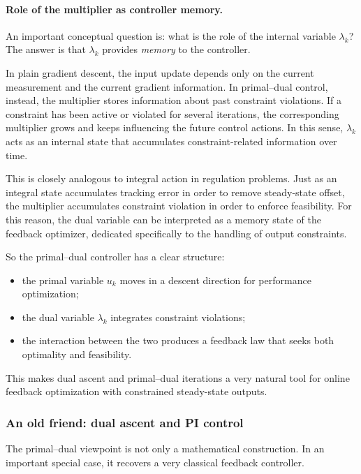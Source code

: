 \paragraph{Role of the multiplier as controller memory.}
An important conceptual question is: what is the role of the internal variable $\lambda_k$? The answer is that $\lambda_k$ provides \emph{memory} to the controller.

In plain gradient descent, the input update depends only on the current measurement and the current gradient information. In primal--dual control, instead, the multiplier stores information about past constraint violations. If a constraint has been active or violated for several iterations, the corresponding multiplier grows and keeps influencing the future control actions. In this sense, $\lambda_k$ acts as an internal state that accumulates constraint-related information over time.

This is closely analogous to integral action in regulation problems. Just as an integral state accumulates tracking error in order to remove steady-state offset, the multiplier accumulates constraint violation in order to enforce feasibility. For this reason, the dual variable can be interpreted as a memory state of the feedback optimizer, dedicated specifically to the handling of output constraints.

So the primal--dual controller has a clear structure:
\begin{itemize}
    \item the primal variable $u_k$ moves in a descent direction for performance optimization;
    \item the dual variable $\lambda_k$ integrates constraint violations;
    \item the interaction between the two produces a feedback law that seeks both optimality and feasibility.
\end{itemize}

This makes dual ascent and primal--dual iterations a very natural tool for online feedback optimization with constrained steady-state outputs.

\subsubsection{An old friend: dual ascent and PI control}

The primal--dual viewpoint is not only a mathematical construction. In an important special case, it recovers a very classical feedback controller.

